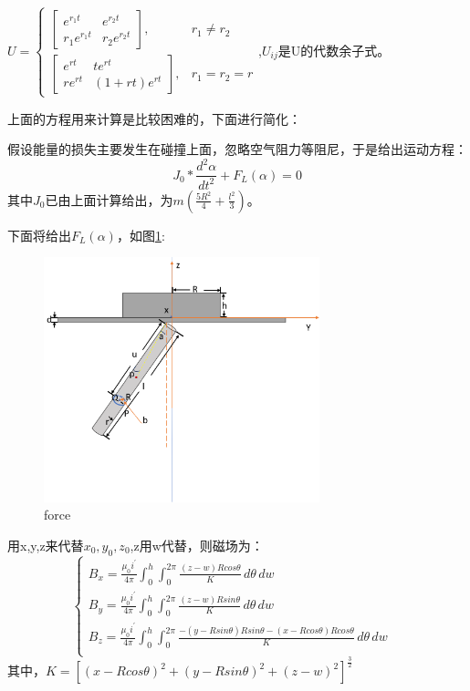 \documentclass[AutoFakeBold]{LZUThesis}
\begin{document}
$U = \left \{
\begin{array}{lr}
\left[
\begin{matrix}
    e^{r_1t} &e^{r_2t} \\
    r_1e^{r_1t} &r_2e^{r_2t}
\end{matrix} \right], &r_1\neq r_2 \\


\left[
\begin{matrix}
    e^{rt} &te^{rt} \\
    re^{rt} &(1+rt)e^{rt}
\end{matrix}\right], &r_1 = r_2 = r
\end{array}
\right.$,$U_{ij}$是U的代数余子式。

上面的方程用来计算是比较困难的，下面进行简化：

假设能量的损失主要发生在碰撞上面，忽略空气阻力等阻尼，于是给出运动方程：
\begin{equation}
    J_{0}*\frac{d^{2}\alpha}{dt^{2}} + F_{L}(\alpha) = 0
\end{equation}
其中$J_{0}$已由上面计算给出，为$m(\frac{5R^2}{4} + \frac{l^2}{3})$。

下面将给出$F_{L}(\alpha)$，如图\ref{force}:
\begin{figure}[H]
    \centering
    \includegraphics[width=8cm]{figures/force.png}
    \caption{force}
    \label{force}
\end{figure}

用x,y,z来代替$x_{0},y_{0},z_{0}$,z用w代替，则磁场为：
\begin{equation}
    \left \{
    \begin{array}{lr}
    B_x = \frac{\mu_0i^{'}}{4\pi} \int_{0}^{h}\int_{0}^{2\pi} \frac{(z - w)Rcos\theta}{K} \,d\theta\,dw & \\
    B_y = \frac{\mu_0i^{'}}{4\pi} \int_{0}^{h}\int_{0}^{2\pi} \frac{(z - w)Rsin\theta}{K} \,d\theta\,dw & \\
    B_z = \frac{\mu_0i^{'}}{4\pi} \int_{0}^{h}\int_{0}^{2\pi} \frac{-(y - Rsin\theta)Rsin\theta -(x - Rcos\theta)Rcos\theta}{K} \,d\theta\,dw & \\
    \end{array}
    \right.
\end{equation}
其中，$K = [(x - Rcos\theta)^2 + (y -Rsin\theta)^2 + (z - w)^2]^\frac{3}{2}$
\end{document}
